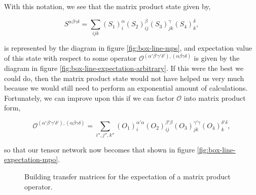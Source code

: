 \documentclass[12pt]{amsbook}
\theoremstyle{plain}
\theoremstyle{definition}
\theoremstyle{remark}
\newcommand{\paren}[1]{\left(#1\right)}
\begin{document}
With this notation, we see that the matrix product state given by,

$$S^{\alpha\beta\gamma\delta} = \sum_{ijk} \paren{S_1}_{i}^\alpha\paren{S_2}_{ij}^\beta\paren{S_3}_{jk}^\gamma\paren{S_4}_{k}^\delta,$$

\noindent is represented by the diagram in figure \ref{fig:box-line-mps},  and expectation value of this state with respect to some operator $\mathscr{O}^{(\alpha'\beta'\gamma'\delta'),(\alpha\beta\gamma\delta)}$ is given by the diagram in figure \ref{fig:box-line-expectation-arbitrary}.  If this were the best we could do, then the matrix product state would not have helped us very much because we would still need to perform an exponential amount of calculations.  Fortunately, we can improve upon this if we can factor $\mathscr{O}$ into matrix product form,

$$\mathscr{O}^{(\alpha'\beta'\gamma'\delta'),(\alpha\beta\gamma\delta)}
  = \sum_{i'',j'',k''}\paren{O_1}^{\alpha'\alpha}_i\paren{O_2}^{\beta'\beta}_{ij}\paren{O_3}^{\gamma'\gamma}_{jk}\paren{O_4}^{\delta'\delta}_k,
$$

\noindent so that our tensor network now becomes that shown in figure \ref{fig:box-line-expectation-mpo}.

\begin{figure}
\caption{Building transfer matrices for the expectation of a matrix product operator.}
\label{fig:formation-of-transfer-matrices}
\end{figure}
\end{document}
